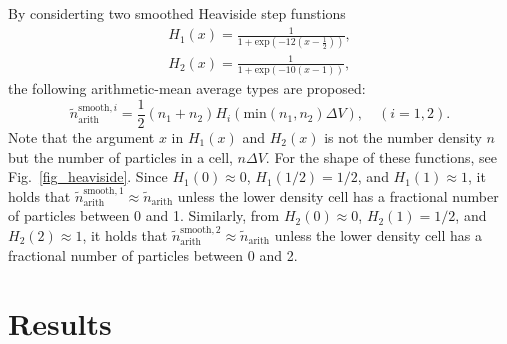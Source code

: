 \documentclass{article}
\begin{document}
By considerting two smoothed Heaviside step funstions
\begin{align}
\label{H1}
H_1(x)=\frac{1}{1+\mathrm{exp}(-12(x-\frac{1}{2}))},\\
\label{H2}
H_2(x)=\frac{1}{1+\mathrm{exp}(-10(x-1))},
\end{align}
the following arithmetic-mean average types are proposed:
\begin{equation}
\tilde{n}_\mathrm{arith}^{\mathrm{smooth},i} = \frac{1}{2}(n_1+n_2)H_i(\mathrm{min}(n_1,n_2)\Delta V),\quad (i=1,2).
\end{equation}
Note that the argument $x$ in $H_1(x)$ and $H_2(x)$ is not the number density $n$ but the number of particles in a cell, $n\Delta V$.
For the shape of these functions, see Fig.~\ref{fig_heaviside}.
Since $H_1(0)\approx 0$, $H_1(1/2)=1/2$, and $H_1(1)\approx 1$, it holds that $\tilde{n}_\mathrm{arith}^{\mathrm{smooth},1}\approx \tilde{n}_\mathrm{arith}$ unless the lower density cell has a fractional number of particles between 0 and 1.   
Similarly, from $H_2(0)\approx 0$, $H_2(1)=1/2$, and $H_2(2)\approx 1$, it holds that $\tilde{n}_\mathrm{arith}^{\mathrm{smooth},2}\approx \tilde{n}_\mathrm{arith}$ unless the lower density cell has a fractional number of particles between 0 and 2.   

\section{Results}
\end{document}
